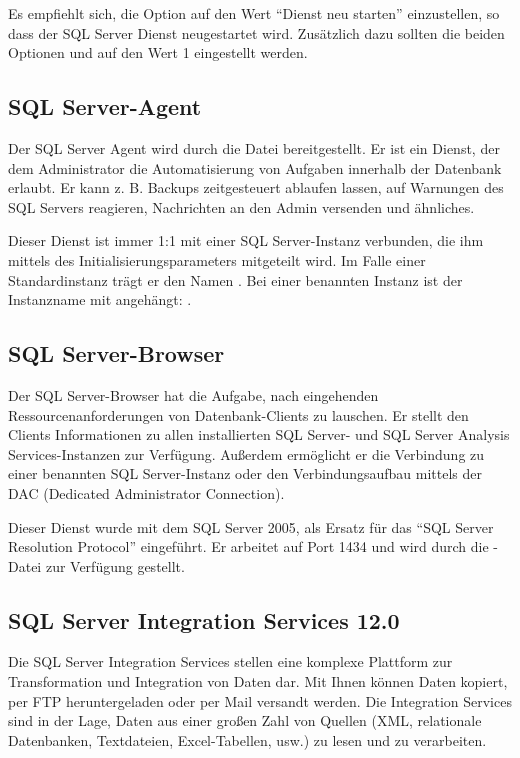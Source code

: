           Es empfiehlt sich, die Option  auf den
          Wert \enquote{Dienst neu starten} einzustellen, so dass der SQL Server
          Dienst neugestartet wird. Zusätzlich dazu sollten die beiden Optionen
           und
           auf den Wert 1
          eingestellt werden.
      \subsection{SQL Server-Agent}
        Der SQL Server Agent wird durch die Datei 
        bereitgestellt. Er ist ein Dienst, der dem Administrator die
        Automatisierung von Aufgaben innerhalb der Datenbank erlaubt. Er kann z.
        B. Backups zeitgesteuert ablaufen lassen, auf Warnungen des SQL Servers
        reagieren, Nachrichten an den Admin versenden und ähnliches.
        
        Dieser Dienst ist immer 1:1 mit einer SQL Server-Instanz verbunden,
        die ihm mittels des Initialisierungsparameters  mitgeteilt wird. Im Falle einer Standardinstanz
        trägt er den Namen .
        Bei einer benannten Instanz ist der Instanzname mit angehängt:
        .
      \subsection{SQL Server-Browser}
        Der SQL Server-Browser hat die Aufgabe, nach eingehenden
        Ressourcenanforderungen von Datenbank-Clients zu lauschen. Er stellt den
        Clients Informationen zu allen installierten SQL Server- und SQL
        Server Analysis Services-Instanzen zur Verfügung. Außerdem ermöglicht er
        die Verbindung zu einer benannten SQL Server-Instanz oder den
        Verbindungsaufbau mittels der DAC (Dedicated Administrator Connection).
  
        Dieser Dienst wurde mit dem SQL Server 2005, als Ersatz f\"ur das
        \enquote{SQL Server Resolution Protocol} eingeführt. Er arbeitet auf Port
        1434 und wird durch die -Datei
         zur Verfügung gestellt.
      \subsection{SQL Server Integration Services 12.0}
        Die SQL Server Integration Services stellen eine komplexe Plattform zur
        Transformation und Integration von Daten dar. Mit Ihnen können Daten
        kopiert, per FTP heruntergeladen oder per Mail versandt werden. Die
        Integration Services sind in der Lage, Daten aus einer großen Zahl von
        Quellen (XML, relationale Datenbanken, Textdateien, Excel-Tabellen,
        usw.) zu lesen und zu verarbeiten.
        
